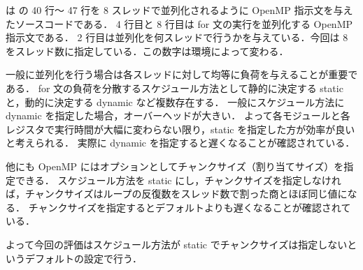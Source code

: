 は の 40 行〜 47 行を 8 スレッドで並列化されるように OpenMP 指示文を与えたソースコードである．
4 行目と 8 行目は for 文の実行を並列化する OpenMP 指示文である．
2 行目は並列化を何スレッドで行うかを与えている．今回は 8 をスレッド数に指定している．この数字は環境によって変わる．

一般に並列化を行う場合は各スレッドに対して均等に負荷を与えることが重要である．
for 文の負荷を分散するスケジュール方法として静的に決定する static と，動的に決定する dynamic など複数存在する．
一般にスケジュール方法に dynamic を指定した場合，オーバーヘッドが大きい．
よって各モジュールと各レジスタで実行時間が大幅に変わらない限り，static を指定した方が効率が良いと考えられる．
実際に dynamic を指定すると遅くなることが確認されている．

他にも OpenMP にはオプションとしてチャンクサイズ（割り当てサイズ）を指定できる．
スケジュール方法を static にし，チャンクサイズを指定しなければ，チャンクサイズはループの反復数をスレッド数で割った商とほぼ同じ値になる．
チャンクサイズを指定するとデフォルトよりも遅くなることが確認されている．

よって今回の評価はスケジュール方法が static でチャンクサイズは指定しないというデフォルトの設定で行う．
